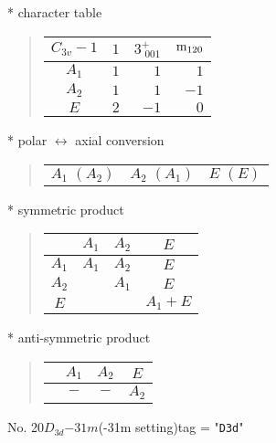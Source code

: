 \documentclass[fleqn,10pt,landscape]{jsarticle}
\begin{document}
* character table
\begin{quote}
\begin{tabular}{crrr} \hline \hline
$ C_{3v}-1 $ & $ 1 $ & $ 3^{+}_{\,\,001} $ & $ {\rm m}_{120} $ \\ \hline
$ A_{1} $ & $ 1 $ & $ 1 $ & $ 1 $ \\
$ A_{2} $ & $ 1 $ & $ 1 $ & $ -1 $ \\
$ E $ & $ 2 $ & $ -1 $ & $ 0 $ \\
 \hline \hline
\end{tabular}
\end{quote}
* polar $\leftrightarrow$ axial conversion
\begin{quote}
\begin{tabular}{ccc}
$ A_{1}\,\,(A_{2}) $ & $ A_{2}\,\,(A_{1}) $ & $ E\,\,(E) $
\end{tabular}
\end{quote}
* symmetric product
\begin{quote}
\begin{tabular}{c|ccc} \hline \hline
 & $ A_{1} $ & $ A_{2} $ & $ E $ \\ \hline
$ A_{1} $ & $ A_{1} $ & $ A_{2} $ & $ E $ \\
$ A_{2} $ & $  $ & $ A_{1} $ & $ E $ \\
$ E $ & $  $ & $  $ & $ A_{1} + E $ \\
 \hline \hline
\end{tabular}
\end{quote}
* anti-symmetric product
\begin{quote}
\begin{tabular}{cccc} \hline \hline
 & $ A_{1} $ & $ A_{2} $ & $ E $ \\ \hline
$  $ & $ - $ & $ - $ & $ A_{2} $ \\
 \hline \hline
\end{tabular}
\end{quote}
\newpage
No. 20\quad$D_{3d}$\quad$-31m$\quad(-31m setting)\quad[ trigonal ]
tag = "{\tt D3d}"
\end{document}
